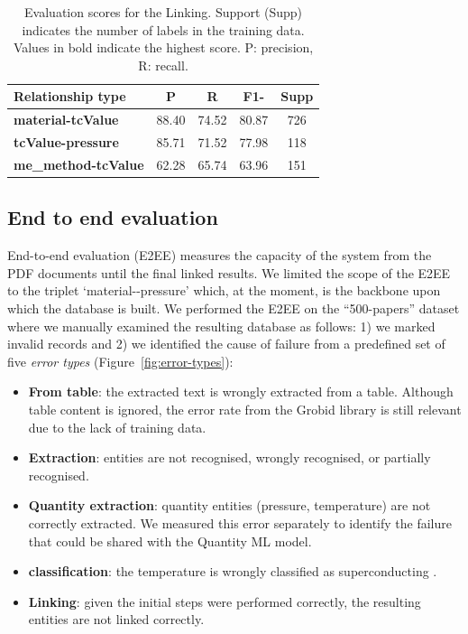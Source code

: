 \begin{table}[htbp]
    \centering
    \caption{Evaluation scores for the Linking. Support (Supp) indicates the number of labels in the training data. Values in bold indicate the highest score. P: precision, R: recall.}
    \begin{tabular}{lcccc}
        \toprule
        \textbf{Relationship type}          & \textbf{P} & \textbf{R} & \textbf{F1-} & Supp \\
        \midrule
        \textbf{material-tcValue}   & 88.40              & 74.52           & 80.87             & 726     \\
        \textbf{tcValue-pressure}   & 85.71              & 71.52           & 77.98             & 118     \\
        \textbf{me\_method-tcValue} & 62.28              & 65.74           & 63.96             & 151     \\
        \bottomrule
    \end{tabular}

    \label{table:evaluation-linking}
\end{table}



\subsection{End to end evaluation}
\label{sec:end2end}
End-to-end evaluation (E2EE) measures the capacity of the system from the PDF documents until the final linked results.
We limited the scope of the E2EE to the triplet `material-\tc-pressure' which, at the moment, is the backbone upon which the database is built.
We performed the E2EE on the ``500-papers'' dataset where we manually examined the resulting database as follows: 1) we marked invalid records and 2) we identified the cause of failure from a predefined set of five \textit{error types} (Figure~\ref{fig:error-types}):
\begin{itemize}
    \item \textbf{From table}: the extracted text is wrongly extracted from a table. Although table content is ignored, the error rate from the Grobid library is still relevant due to the lack of training data.
    \item \textbf{Extraction}: entities are not recognised, wrongly recognised, or partially recognised.
    \item \textbf{Quantity extraction}: quantity entities (pressure, temperature) are not correctly extracted. We measured this error separately to identify the failure that could be shared with the Quantity ML model.
    \item \textbf{\tc classification}: the temperature is wrongly classified as superconducting \tc.
    \item \textbf{Linking}: given the initial steps were performed correctly, the resulting entities are not linked correctly.
\end{itemize}

